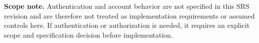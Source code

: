 \documentclass[10pt,a4paper]{article}
\begin{document}
\textbf{Scope note.} Authentication and account behavior are not specified in
this SRS revision and are therefore not treated as implementation requirements
or assumed controls here. If authentication or authorization is needed, it
requires an explicit scope and specification decision before implementation.
\end{document}
